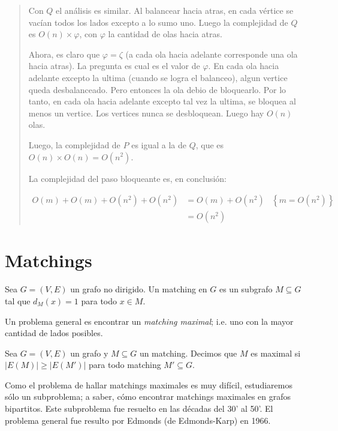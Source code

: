 \documentclass[a4paper]{article}
\begin{document}
\begin{quote}
Con $Q$ el análisis es similar. Al balancear hacia atras, en cada vértice se
vacían todos los lados excepto a lo sumo uno. Luego la complejidad de $Q$ es
$O(n) \times \varphi$, con $\varphi$ la cantidad de olas hacia atras.

Ahora, es claro que $\varphi = \zeta$ (a cada ola hacia adelante corresponde
una ola hacia atras). La pregunta es cual es el valor de $\varphi$. En cada ola
hacia adelante excepto la ultima (cuando se logra el balanceo), algun vertice
queda desbalanceado. Pero entonces la ola debio de bloquearlo. Por lo tanto,
en cada ola hacia adelante excepto tal vez la ultima, se bloquea al menos un
vertice. Los vertices nunca se desbloquean. Luego hay $O(n)$ olas.

Luego, la complejidad de $P$ es igual a la de $Q$, que es $O(n) \times O(n) =
O(n^2)$. 

La complejidad del paso bloqueante es, en conclusión:

\begin{align*}
    O(m) + O(m) + O(n^2) + O(n^2) &= O(m) + O(n^2) &\left\{ m = O(n^2) \right\}
                               \\ &= O(n^2)
\end{align*}




\end{quote}
\normalsize

\pagebreak 

\section{Matchings}

\begin{definition}
    Sea $G = (V, E) $ un grafo no dirigido. Un matching en $G$ es un subgrafo $M
    \subseteq G$ tal que $d_M(x) = 1$ para todo $x \in M$.
\end{definition}

Un problema general es encontrar un \textit{matching maximal}; i.e. uno con la 
mayor cantidad de lados posibles.

\begin{definition}
    Sea $G = (V, E) $ un grafo y $M \subseteq G$ un matching. Decimos que $M$
    es maximal si $|E(M)| \geq |E(M')|$ para todo matching $M' \subseteq G$.
\end{definition}

Como el problema de hallar matchings maximales es muy difícil, estudiaremos
sólo un subproblema; a saber, cómo encontrar matchings maximales en grafos
bipartitos. Este subproblema fue resuelto en las décadas del 30' al 50'. 
El problema general fue resulto por Edmonds (de Edmonds-Karp) en 1966.
\end{document}
